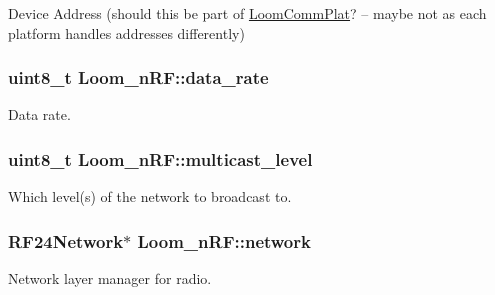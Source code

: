 Device Address (should this be part of \hyperlink{class_loom_comm_plat}{Loom\+Comm\+Plat}? – maybe not as each platform handles addresses differently) 

\subsubsection[{\texorpdfstring{data\+\_\+rate}{data_rate}}]{\setlength{\rightskip}{0pt plus 5cm}uint8\+\_\+t Loom\+\_\+n\+R\+F\+::data\+\_\+rate\hspace{0.3cm}{\ttfamily [protected]}}\hypertarget{class_loom__n_r_f_aa07c72a33cf70c119ff333b3177aadd0}{}\label{class_loom__n_r_f_aa07c72a33cf70c119ff333b3177aadd0}


Data rate. 

\subsubsection[{\texorpdfstring{multicast\+\_\+level}{multicast_level}}]{\setlength{\rightskip}{0pt plus 5cm}uint8\+\_\+t Loom\+\_\+n\+R\+F\+::multicast\+\_\+level\hspace{0.3cm}{\ttfamily [protected]}}\hypertarget{class_loom__n_r_f_a91e29e17ba984dc899ca11507adfd9f9}{}\label{class_loom__n_r_f_a91e29e17ba984dc899ca11507adfd9f9}


Which level(s) of the network to broadcast to. 

\subsubsection[{\texorpdfstring{network}{network}}]{\setlength{\rightskip}{0pt plus 5cm}R\+F24\+Network$\ast$ Loom\+\_\+n\+R\+F\+::network\hspace{0.3cm}{\ttfamily [protected]}}\hypertarget{class_loom__n_r_f_ac9f3accb15e32baa80557f03da7a4990}{}\label{class_loom__n_r_f_ac9f3accb15e32baa80557f03da7a4990}


Network layer manager for radio. 

